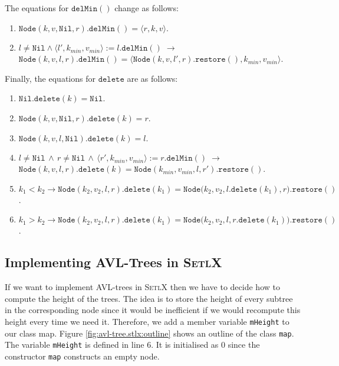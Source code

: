 The equations for  $\mathtt{delMin}()$ change as follows:
\begin{enumerate}
\item $\mathtt{Node}(k, v, \mathtt{Nil}, r).\mathtt{delMin}() = \langle r, k, v \rangle$.
\item $l\not= \mathtt{Nil} \wedge \langle l',k_{min}, v_{min}\rangle := l.\mathtt{delMin}() 
       \;\rightarrow$ \\[0.2cm]
       \hspace*{1.3cm} 
       $\mathtt{Node}(k, v, l, r).\mathtt{delMin}() = 
        \langle \mathtt{Node}(k, v, l', r).\mathtt{restore}(), k_{min}, v_{min} \rangle$.
\end{enumerate}
Finally, the equations for $\mathtt{delete}$ are as follows:
\begin{enumerate}
\item $\mathtt{Nil}.\mathtt{delete}(k) = \mathtt{Nil}$.
\item $\mathtt{Node}(k,v,\mathtt{Nil},r).\mathtt{delete}(k) = r$.
\item $\mathtt{Node}(k,v,l,\mathtt{Nil}).\mathtt{delete}(k) = l$.
\item $l \not= \mathtt{Nil} \,\wedge\, r \not= \mathtt{Nil} \,\wedge\, 
       \langle r',k_{min}, v_{min} \rangle := r.\mathtt{delMin}()  \;\rightarrow$ \\[0.2cm]
      \hspace*{1.3cm}
      $\mathtt{Node}(k,v,l,r).\mathtt{delete}(k) = \mathtt{Node}(k_{min},v_{min},l,r').\mathtt{restore}()$.
\item $k_1 < k_2 \rightarrow \mathtt{Node}(k_2,v_2,l,r).\mathtt{delete}(k_1) = 
       \mathtt{Node}\bigl(k_2,v_2,l.\mathtt{delete}(k_1),r\bigr).\mathtt{restore}()$.
\item $k_1 > k_2 \rightarrow \mathtt{Node}(k_2,v_2,l,r).\mathtt{delete}(k_1) = 
         \mathtt{Node}\bigl(k_2,v_2,l,r.\mathtt{delete}(k_1)\bigr).\mathtt{restore}()$.
\end{enumerate}


\subsection{Implementing AVL-Trees in \textsc{SetlX}}
If we want to implement AVL-trees in \textsc{SetlX} then we have to decide how to compute the height
of the trees.  The idea is to store the height of every subtree in the corresponding node since it
would be inefficient if we would recompute this height every time we need it.  Therefore, we add a
member variable \texttt{mHeight} to our class map.
Figure \ref{fig:avl-tree.stlx:outline} shows an outline of the class \texttt{map}.  The variable
\texttt{mHeight} is defined in line 6.  It is initialised as $0$ since the constructor \texttt{map}
constructs an empty node.  

